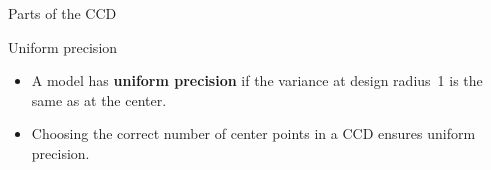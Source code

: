\documentclass[10pt]{beamer}\usepackage[]{graphicx}\usepackage[]{color}
\begin{document}
\begin{frame}{Parts of the CCD}
\begin{itemize}[<+->]
\end{itemize}
\end{frame}

\begin{frame}{Uniform precision}

\begin{itemize}
	\item A model has \textbf{uniform precision} if the variance at design radius~1 is the same as at the center.
\end{itemize}


\begin{itemize}
	\item<3-> Choosing the correct number of center points in a CCD ensures uniform precision.
\end{itemize}
	
\end{frame}
\end{document}
